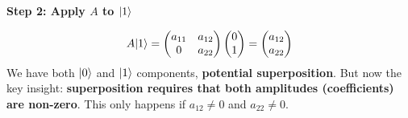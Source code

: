 \highspace
\begin{flushleft}
    \textcolor{Green3}{\textbf{Step 2: Apply $A$ to $| 1 \rangle$}}
\end{flushleft}
\begin{equation*}
    A| 1 \rangle
    =
    \begin{pmatrix}
        a_{11} & a_{12} \\ 0 & a_{22}
    \end{pmatrix}
    \begin{pmatrix}
        0 \\ 1
    \end{pmatrix}
    =
    \begin{pmatrix}
        a_{12} \\ a_{22}
    \end{pmatrix}
\end{equation*}
We have both $| 0 \rangle$ and $| 1 \rangle$ components, \textbf{potential superposition}. But now the key insight: \textbf{superposition requires that both amplitudes (coefficients) are non-zero}. This only happens if $a_{12} \ne 0$ and $a_{22} \ne 0$.

